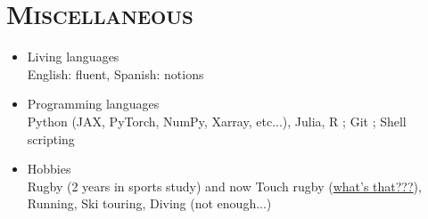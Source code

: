 \documentclass{article}
\begin{document}
\section*{\textsc{Miscellaneous}}
\begin{itemize}
    \item[] Living languages \\[.1 cm] \tabto{2cm} English: fluent, Spanish: notions
    \item[] Programming languages \\[.1 cm] \tabto{2cm} Python (JAX, PyTorch, NumPy, Xarray, etc...), Julia, R ; Git ; Shell scripting
    \item[] Hobbies \\[.1 cm] \tabto{2cm} Rugby (2 years in sports study) and now Touch rugby (\href{https://youtu.be/yE_VXFf4pCk?si=aiIs_IFJW4eTuIwQ}{what's that???}), Running, Ski touring, Diving (not \tabto{2cm} enough...)
\end{itemize}
\end{document}
